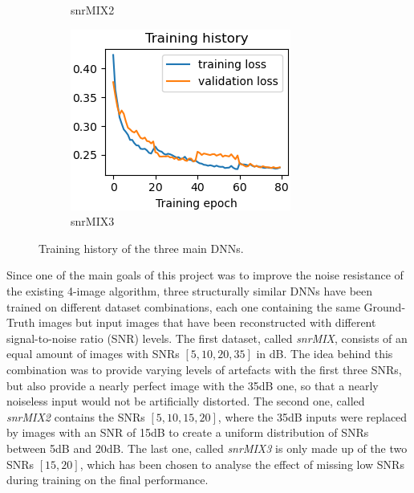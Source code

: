 \documentclass[conference]{IEEEtran}
\begin{document}
\begin{figure}[h]
\begin{subfigure}[b]{0.157\textwidth}
        \caption{snrMIX2}
        \label{fig:train_hist_snrMIX2}
    \end{subfigure}
    \begin{subfigure}[b]{0.162\textwidth}
        \centering
        \includegraphics[width=\textwidth]{images/train_hist_snrMIX3.png}
        \caption{snrMIX3}
        \label{fig:train_hist_snrMIX3}
    \end{subfigure}
    \caption{Training history of the three main DNNs.}
    \label{fig:train_curves}
\end{figure}

Since one of the main goals of this project was to improve the noise resistance of the existing 4-image algorithm, three structurally similar DNNs have been trained on different dataset combinations, each one containing the same Ground-Truth images but input images that have been reconstructed with different signal-to-noise ratio (SNR) levels. The first dataset, called \textit{snrMIX}, consists of an equal amount of images with SNRs $[5,10,20,35]$ in dB. The idea behind this combination was to provide varying levels of artefacts with the first three SNRs, but also provide a nearly perfect image with the 35dB one, so that a nearly noiseless input would not be artificially distorted. The second one, called \textit{snrMIX2} contains the SNRs $[5,10,15,20]$, where the 35dB inputs were replaced by images with an SNR of 15dB to create a uniform distribution of SNRs between 5dB and 20dB. The last one, called \textit{snrMIX3} is only made up of the two SNRs $[15,20]$, which has been chosen to analyse the effect of missing low SNRs during training on the final performance. 
\end{document}

